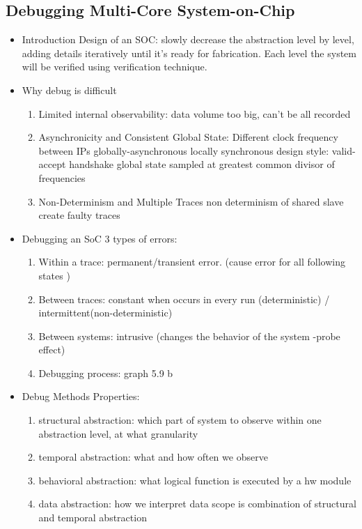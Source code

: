 \documentclass[conference]{IEEEtran}
\begin{document}
\subsection{Debugging Multi-Core System-on-Chip}
\begin{itemize}	
\item Introduction
		Design of an SOC: slowly decrease the abstraction level by level, adding details iteratively until it's ready for fabrication.
						  Each level the system will be verified using verification technique.
\item Why debug is difficult
	\begin{enumerate}
	\item Limited internal observability: data volume too big, can't be all recorded
	\item Asynchronicity and Consistent Global State: Different clock frequency between IPs
			globally-asynchronous locally synchronous design style: valid-accept handshake 
			global state sampled at greatest common divisor of frequencies
	\item Non-Determinism and Multiple Traces
			non determinism of shared slave create faulty traces
	\end{enumerate}			
\item Debugging an SoC
		3 types of errors:
		\begin {enumerate}
		\item Within a trace: permanent/transient error. (cause error for all following states )
		\item  Between traces: constant when occurs in every run (deterministic) / intermittent(non-deterministic)
		\item  Between systems: intrusive (changes the behavior of the system -probe effect)
		\item Debugging process:
			graph 5.9 b
		\end{enumerate}
\item Debug Methods
		Properties:
			\begin {enumerate}
			\item structural abstraction: which part of system to observe within one abstraction level, at what granularity
			\item temporal abstraction: what and how often we observe
			\item behavioral abstraction: what logical function is executed by a hw module
			\item data abstraction: how we interpret data
			scope is combination of structural and temporal abstraction

\end{enumerate}
\end{itemize}
\end{document}
